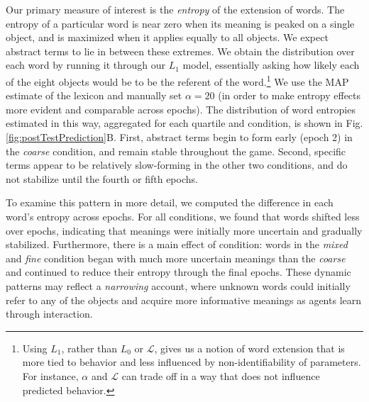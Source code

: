 \documentclass[10pt,letterpaper]{article}
\newcommand{\ndg}[1]{\textcolor{Green}{[ndg: #1]}}
\begin{document}

Our primary measure of interest is the \emph{entropy} of the extension of words. The entropy of a particular word is near zero when its meaning is peaked on a single object, and is maximized when it applies equally to all objects. 
We expect abstract terms to lie in between these extremes. 
We obtain the distribution over each word by running it through our $L_1$ model, essentially asking how likely each of the eight objects would be to be the referent of the word.\footnote{Using $L_1$, rather than $L_0$ or $\mathcal{L}$, gives us a notion of word extension that is more tied to behavior and less influenced by non-identifiability of parameters. For instance, $\alpha$ and $\mathcal{L}$ can trade off in a way that does not influence predicted behavior.} 
We use the MAP estimate of the lexicon and manually set $\alpha = 20$ (in order to make entropy effects more evident and comparable across epochs). 
The distribution of word entropies estimated in this way, aggregated for each quartile and condition, is shown in Fig. \ref{fig:postTestPrediction}B. %
First, abstract terms begin to form early (epoch 2) in the \emph{coarse} condition, and remain stable throughout the game. Second, specific terms appear to be relatively slow-forming in the other two conditions, and do not stabilize until the fourth or fifth epochs. 

To examine this pattern in more detail, we computed the difference in each word's entropy across epochs. For all conditions, we found that words shifted less over epochs, indicating that meanings were initially more uncertain and gradually stabilized. Furthermore, there is a main effect of condition: words in the \emph{mixed} and \emph{fine} condition began with much more uncertain meanings than the \emph{coarse} and continued to reduce their entropy through the final epochs. %
These dynamic patterns may reflect a \emph{narrowing} account, where unknown words could initially refer to any of the objects and acquire more informative meanings as agents learn through interaction.
\end{document}
